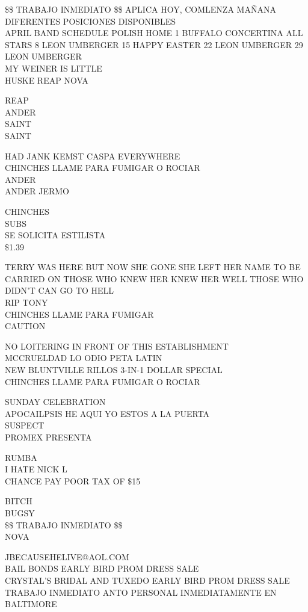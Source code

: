 \documentclass[10pt,letterpaper]{article}
\begin{document}
\$\$ TRABAJO INMEDIATO \$\$ APLICA HOY, COMLENZA MAÑANA DIFERENTES POSICIONES DISPONIBLES\\
APRIL BAND SCHEDULE POLISH HOME 1 BUFFALO CONCERTINA ALL STARS 8 LEON UMBERGER 15 HAPPY EASTER 22 LEON UMBERGER 29 LEON UMBERGER\\
MY WEINER IS LITTLE\\
HUSKE REAP NOVA

REAP\\
ANDER\\
SAINT\\
SAINT

HAD JANK KEMST CASPA EVERYWHERE\\
CHINCHES LLAME PARA FUMIGAR O ROCIAR\\
ANDER\\
ANDER JERMO

CHINCHES\\
SUBS\\
SE SOLICITA ESTILISTA\\
\$1.39

TERRY WAS HERE BUT NOW SHE GONE SHE LEFT HER NAME TO BE CARRIED ON THOSE WHO KNEW HER KNEW HER WELL THOSE WHO DIDN'T CAN GO TO HELL\\
RIP TONY\\
CHINCHES LLAME PARA FUMIGAR\\
CAUTION

NO LOITERING IN FRONT OF THIS ESTABLISHMENT\\
MCCRUELDAD LO ODIO PETA LATIN\\
NEW BLUNTVILLE RILLOS 3{-}IN{-}1 DOLLAR SPECIAL\\
CHINCHES LLAME PARA FUMIGAR O ROCIAR

SUNDAY CELEBRATION\\
APOCAILPSIS HE AQUI YO ESTOS A LA PUERTA\\
SUSPECT\\
PROMEX PRESENTA

RUMBA\\
I HATE NICK L\\
CHANCE PAY POOR TAX OF \$15

BITCH\\
BUGSY\\
\$\$ TRABAJO INMEDIATO \$\$\\
NOVA

JBECAUSEHELIVE@AOL.COM\\
BAIL BONDS EARLY BIRD PROM DRESS SALE\\
CRYSTAL'S BRIDAL AND TUXEDO EARLY BIRD PROM DRESS SALE\\
TRABAJO INMEDIATO ANTO PERSONAL INMEDIATAMENTE EN BALTIMORE
\end{document}
